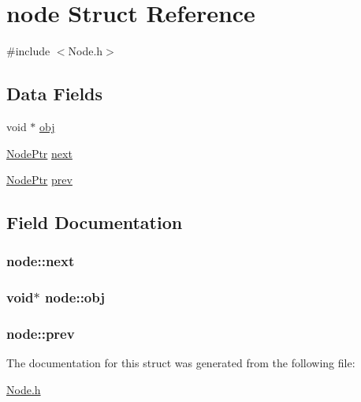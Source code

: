 \hypertarget{structnode}{\section{node Struct Reference}
\label{structnode}
}


{\ttfamily \#include $<$Node.\-h$>$}

\subsection*{Data Fields}
\begin{DoxyCompactItemize}
\item 
void $\ast$ \hyperlink{structnode_ac00350688d2f636aa50ac008f77a5497}{obj}
\item 
\hyperlink{Node_8h_aa6eec21621b8638e350fd0ec238a9715}{Node\-Ptr} \hyperlink{structnode_a29ed78f5e5f0fea79b113e047d18997d}{next}
\item 
\hyperlink{Node_8h_aa6eec21621b8638e350fd0ec238a9715}{Node\-Ptr} \hyperlink{structnode_a8f67d90e34c478e9dd9a5bd51574c8c4}{prev}
\end{DoxyCompactItemize}


\subsection{Field Documentation}
\hypertarget{structnode_a29ed78f5e5f0fea79b113e047d18997d}{
\subsubsection[{next}]{ node\-::next}}\label{structnode_a29ed78f5e5f0fea79b113e047d18997d}
\hypertarget{structnode_ac00350688d2f636aa50ac008f77a5497}{
\subsubsection[{obj}]{\setlength{\rightskip}{0pt plus 5cm}void$\ast$ node\-::obj}}\label{structnode_ac00350688d2f636aa50ac008f77a5497}
\hypertarget{structnode_a8f67d90e34c478e9dd9a5bd51574c8c4}{
\subsubsection[{prev}]{ node\-::prev}}\label{structnode_a8f67d90e34c478e9dd9a5bd51574c8c4}


The documentation for this struct was generated from the following file\-:\begin{DoxyCompactItemize}
\item 
\hyperlink{Node_8h}{Node.\-h}\end{DoxyCompactItemize}

